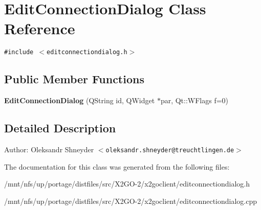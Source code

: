 \section{Edit\-Connection\-Dialog Class Reference}
\label{classEditConnectionDialog}
{\tt \#include $<$editconnectiondialog.h$>$}

\subsection*{Public Member Functions}
\begin{CompactItemize}
\item 
\textbf{Edit\-Connection\-Dialog} (QString id, QWidget $\ast$par, Qt::WFlags f=0)\label{classEditConnectionDialog_4fcb4e47405b6ecd008f8977b297b5d7}

\end{CompactItemize}


\subsection{Detailed Description}
\begin{Desc}
\item[Author:]Oleksandr Shneyder $<$\tt{oleksandr.shneyder@treuchtlingen.de}$>$ \end{Desc}




The documentation for this class was generated from the following files:\begin{CompactItemize}
\item 
/mnt/nfs/up/portage/distfiles/src/X2GO-2/x2goclient/editconnectiondialog.h\item 
/mnt/nfs/up/portage/distfiles/src/X2GO-2/x2goclient/editconnectiondialog.cpp\end{CompactItemize}
